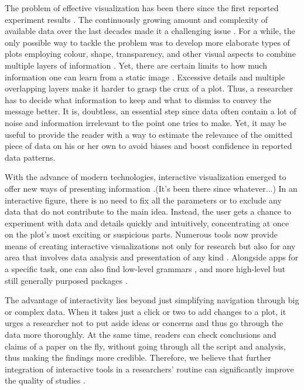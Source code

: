 \documentclass[twocolumn,10pt]{article}
\begin{document}
The problem of effective visualization has been there since the first reported experiment results \citep{friendly_2001}. The continuously growing amount and complexity of available data over the last decades made it a challenging issue \citep{fisher_2017}. For a while, the only possible way to tackle the problem was to develop more elaborate types of plots employing colour, shape, transparency, and other visual aspects to combine multiple layers of information \citep{keahey_2013, bertin_2011, heer_2009}. Yet, there are certain limits to how much information one can learn from a static image \citep{hegarty_2011}. Excessive details and multiple overlapping layers make it harder to grasp the crux of a plot. Thus, a researcher has to decide what information to keep and what to dismiss to convey the message better\citep{odonoghue_2018}. It is, doubtless, an essential step since data often contain a lot of noise and information irrelevant to the point one tries to make. Yet, it may be useful to provide the reader with a way to estimate the relevance of the omitted piece of data on his or her own to avoid biases \citep{bresciani_2009} and boost confidence in reported data patterns.

With the advance of modern technologies, interactive visualization emerged to offer new ways of presenting information \citep{newman_1979, becker_1987}.(It's been there since whatever...) In an interactive figure, there is no need to fix all the parameters or to exclude any data that do not contribute to the main idea. Instead, the user gets a chance to experiment with data and details quickly and intuitively, concentrating at once on the plot's most exciting or suspicious parts. Numerous tools \citep{caldarola_2017} now provide means of creating interactive visualizations not only for research \citep{noronha_2017, wick_2015, hillje_2020, broman_2015} but also for any area that involves data analysis and presentation of any kind \citep{zhao_2012, wu_2010}. Alongside apps for a specific task, one can also find low-level grammars \citep{bostock_2011, satyanarayan_2015}, and more high-level but still generally purposed packages \citep{satyanarayan_2016, shiny, p_2019, sievert_2019, sievert_2020}.

The advantage of interactivity lies beyond just simplifying navigation through big or complex data. When it takes just a click or two to add changes to a plot, it urges a researcher not to put aside ideas or concerns and thus go through the data more thoroughly. At the same time, readers can check conclusions and claims of a paper on the fly, without going through all the script and analysis, thus making the findings more credible. Therefore, we believe that further integration of interactive tools in a researchers' routine can significantly improve the quality of studies \citep{shander_2016, yuk_2014}.
\end{document}

